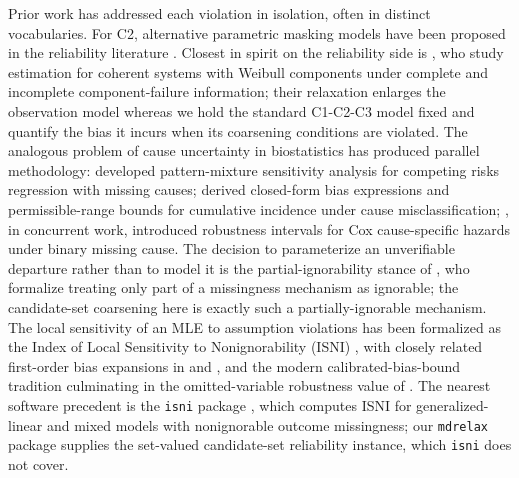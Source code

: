 Prior work has addressed each violation in isolation, often in distinct
vocabularies. For C2, alternative parametric masking models have been
proposed in the reliability literature \citep{LinGuess1994, Guttman1995,
Mukhopadhyay2006, CraiuReiser2006}. Closest in spirit on the reliability
side is \citet{JablonkaCramerHermanns2019}, who study estimation for
coherent systems with Weibull components under complete and incomplete
component-failure information; their relaxation enlarges the observation
model whereas we hold the standard C1-C2-C3 model fixed and quantify the
bias it incurs when its coarsening conditions are violated. The analogous
problem of cause uncertainty in biostatistics has produced parallel
methodology: \citet{MorenoBetancur2015} developed pattern-mixture
sensitivity analysis for competing risks regression with missing causes;
\citet{BakoyannisYiannoutsos2015} derived closed-form bias expressions and
permissible-range bounds for cumulative incidence under cause
misclassification; \citet{Bakoyannis2025}, in concurrent work, introduced
robustness intervals for Cox cause-specific hazards under binary missing
cause. The decision to parameterize an unverifiable departure rather than
to model it is the partial-ignorability stance of
\citet{HarelSchafer2009}, who formalize treating only part of a missingness
mechanism as ignorable; the candidate-set coarsening here is exactly such a
partially-ignorable mechanism. The local sensitivity of an MLE to
assumption violations has been formalized as the Index of Local Sensitivity
to Nonignorability (ISNI) \citep{TroxelMaHeitjan2004, ZhangHeitjan2006},
with closely related first-order bias expansions in \citet{CopasEguchi2005}
and \citet{SiannisCopasLu2005}, and the modern calibrated-bias-bound
tradition culminating in the omitted-variable robustness value of
\citet{CinelliHazlett2020}. The nearest software precedent is the
\texttt{isni} package \citep{XieGaoHeitjan2018}, which computes ISNI for
generalized-linear and mixed models with nonignorable outcome missingness;
our \texttt{mdrelax} package supplies the set-valued candidate-set
reliability instance, which \texttt{isni} does not cover.

